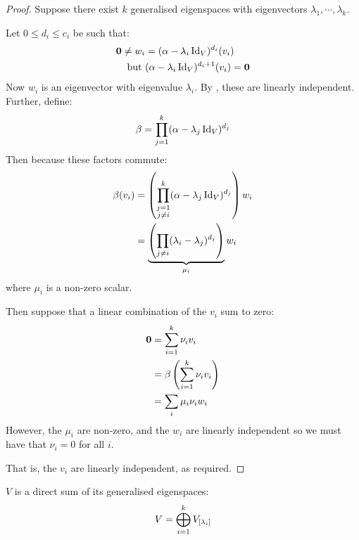 \documentclass[../Main.tex]{subfiles}
\begin{document}
\begin{proof}
    Suppose there exist $k$ generalised eigenspaces with eigenvectors $\lambda_1, \cdots, \lambda_k$.

    Let $0 \leq d_i \leq c_i$ be such that:
    \begin{align*}
        \boldsymbol{0} \neq w_i &= (\alpha - \lambda_i \operatorname{Id}_V)^{d_i} (v_i) \\
        \text{but } &(\alpha - \lambda_i \operatorname{Id}_V)^{d_i + 1}(v_i) = \boldsymbol{0}
    \end{align*}
    Now $w_i$ is an eigenvector with eigenvalue $\lambda_i$. By , these are linearly independent. Further, define:
    \begin{equation*}
        \beta = \prod_{j=1}^{k} (\alpha - \lambda_j \operatorname{Id}_V)^{d_j}
    \end{equation*}
    Then because these factors commute:
    \begin{align*}
        \beta(v_i) &= \left(\prod_{\substack{j=1 \\ j \neq i}}^k (\alpha - \lambda_j \operatorname{Id}_V)^{d_j}\right)w_i \\
        &= \underbrace{\left(\prod_{j \neq i} (\lambda_i - \lambda_j)^{d_j}\right)}_{\mu_i} w_i
    \end{align*}
    where $\mu_i$ is a non-zero scalar.

    Then suppose that a linear combination of the $v_i$ sum to zero:
    \begin{align*}
        \boldsymbol{0} &= \sum_{i=1}^{k}\nu_i v_i \\
        &= \beta\left(\sum_{i=1}^{k} \nu_i v_i\right) \\
        &= \sum_i \mu_i \nu_i w_i 
    \end{align*}
    However, the $\mu_i$ are non-zero, and the $w_i$ are linearly independent so we must have that $\nu_i = 0$ for all $i$.

    That is, the $v_i$ are linearly independent, as required.
\end{proof}
\begin{theorem}
    $V$ is a direct sum of its generalised eigenspaces:
    \begin{equation*}
        V = \bigoplus_{i=1}^k {V}_{[\lambda_i]}
    \end{equation*}
    \label{thmGEDecompose}
\end{theorem}
\end{document}
